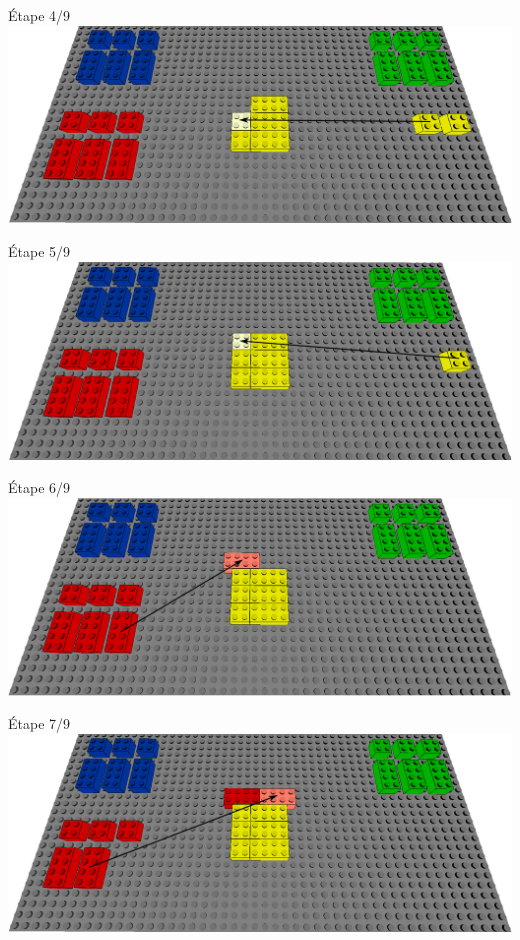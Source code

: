 \documentclass[aspectratio=169]{beamer}
\begin{document}
\begin{frame}
    Étape 4/9
    \vfill
  \includegraphics[width=\linewidth]{step4.png}
\end{frame}

\begin{frame}
    Étape 5/9
    \vfill
  \includegraphics[width=\linewidth]{step5.png}
\end{frame}

\begin{frame}
    Étape 6/9
    \vfill
  \includegraphics[width=\linewidth]{step6.png}
\end{frame}

\begin{frame}
    Étape 7/9
    \vfill
  \includegraphics[width=\linewidth]{step7.png}
\end{frame}
\end{document}
